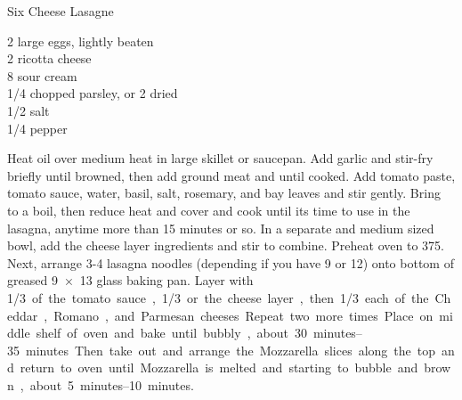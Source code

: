 \begin{entry}{Six Cheese Lasagne}
\begin{ingredients}
    2 large eggs, lightly beaten\\
    \SI{2}{\cup} ricotta cheese\\
    \SI{8}{\ounce} sour cream \\
    \SI{1/4}{\cup} chopped parsley, or \SI{2}{\tblspoon} dried\\
    \SI{1/2}{\teaspoon} salt\\
    \SI{1/4}{\teaspoon} pepper
\end{ingredients}
%
%
Heat oil over medium heat in large skillet or saucepan. Add garlic and
stir-fry briefly until browned, then add ground meat and \saute until
cooked. Add tomato paste, tomato sauce, water, basil, salt, rosemary, and bay
leaves and stir gently. Bring to a boil, then reduce heat and cover and cook
until its time to use in the lasagna, anytime more than 15 minutes or so. In a
separate and medium sized bowl, add the cheese layer ingredients and stir to
combine. Preheat oven to \SI{375}{\degreeF}. Next, arrange 3-4 lasagna noodles
(depending if you have 9 or 12) onto bottom of greased \SI{9x13}{\inch} glass
baking pan. Layer with \SI{1/3} of the tomato sauce, \SI{1/3} or the cheese
layer, then \SI{1/3} each of the Cheddar, Romano, and Parmesan cheeses. Repeat
two more times. Place on middle shelf of oven and bake until bubbly, about
\SIrange{30}{35}{minutes}. Then take out and arrange the Mozzarella slices
along the top and return to oven until Mozzarella is melted and starting to
bubble and brown, about \SIrange{5}{10}{minutes}.
\end{entry}

